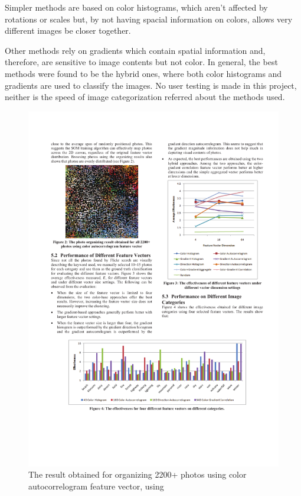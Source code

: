 Simpler methods are based on color histograms, which aren't affected by rotations or scales but, by not having spacial information on colors, allows very different images be closer together.

Other methods rely on gradients which contain spatial information and, therefore, are sensitive to image contents but not color.
In general, the best methods were found to be the hybrid ones, where both color histograms and gradients are used to classify the images.
No user testing is made in this project, neither is the speed of image categorization referred about the methods used.

\begin{figure}[ht]
	\centering
		\includegraphics[scale=1]{imgs-RelatedWork/Strong1}
	\caption{The result obtained for organizing 2200+ photos using color autocorrelogram feature vector, using \cite{Strong:2009p413}}
	\label{fig:Strong1}
\end{figure}

